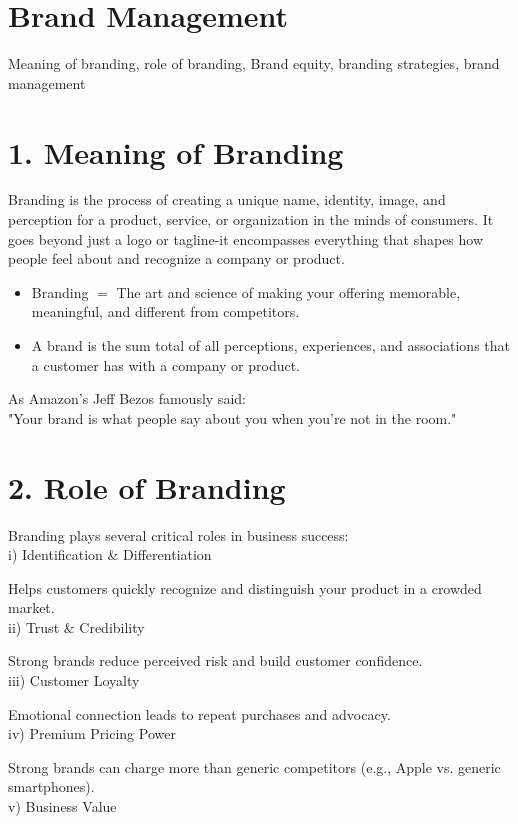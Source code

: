 \documentclass[10pt]{article}
\begin{document}
\section*{Brand Management}
Meaning of branding, role of branding, Brand equity, branding strategies, brand management

\section*{1. Meaning of Branding}
Branding is the process of creating a unique name, identity, image, and perception for a product, service, or organization in the minds of consumers. It goes beyond just a logo or tagline-it encompasses everything that shapes how people feel about and recognize a company or product.

\begin{itemize}
  \item Branding $=$ The art and science of making your offering memorable, meaningful, and different from competitors.
  \item A brand is the sum total of all perceptions, experiences, and associations that a customer has with a company or product.
\end{itemize}

As Amazon's Jeff Bezos famously said:\\
"Your brand is what people say about you when you're not in the room."

\section*{2. Role of Branding}
Branding plays several critical roles in business success:\\
i) Identification \& Differentiation

Helps customers quickly recognize and distinguish your product in a crowded market.\\
ii) Trust \& Credibility

Strong brands reduce perceived risk and build customer confidence.\\
iii) Customer Loyalty

Emotional connection leads to repeat purchases and advocacy.\\
iv) Premium Pricing Power

Strong brands can charge more than generic competitors (e.g., Apple vs. generic smartphones).\\
v) Business Value
\end{document}
